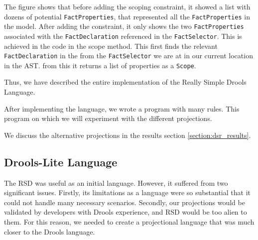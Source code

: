 The figure shows that before adding the scoping constraint, it showed a list with dozens of potential \texttt{FactProperties}, that represented all the \texttt{FactProperties} in the model.
After adding the constraint, it only shows the two \texttt{FactProperties} associated with the \texttt{FactDeclaration} referenced in the \texttt{FactSelector}.
This is achieved in the code in the scope method.
This first finds the relevant \texttt{FactDeclaration} in the from the \texttt{FactSelector} we are at in our current location in the AST.
from this it returns a list of properties as a \texttt{Scope}.

Thus, we have described the entire implementation of the Really Simple Drools Language.

After implementing the language, we wrote a program with many rules.
This program on which we will experiment with the different projections.

We discuss the alternative projections in the results section \ref{section:dsr_results}.

\newpage
\subsection{Drools-Lite Language}
\label{section:DroolsLite}

The RSD was useful as an initial language. 
However, it suffered from two significant issues.
Firstly, its limitations as a language were so substantial that it could not handle many necessary scenarios.
Secondly, our projections would be validated by developers with Drools experience, and RSD would be too alien to them.
For this reason, we needed to create a projectional language that was much closer to the Drools language.

